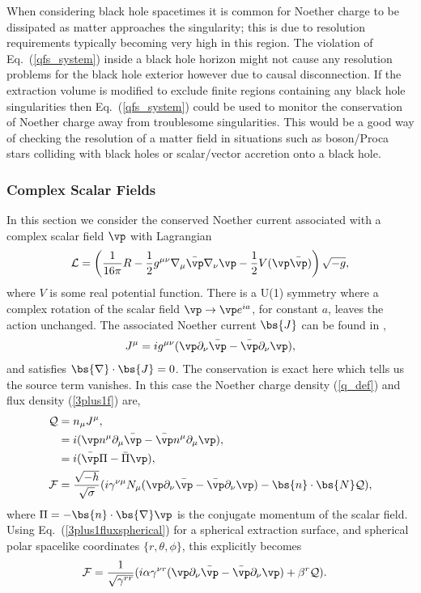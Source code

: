 When considering black hole spacetimes it is common for Noether charge to be dissipated as matter approaches the singularity; this is due to resolution requirements typically becoming very high in this region. The violation of Eq.~(\ref{qfs_system}) inside a black hole horizon might not cause any resolution problems for the black hole exterior however due to causal disconnection. If the extraction volume is modified to exclude finite regions containing any black hole singularities then Eq.~(\ref{qfs_system}) could be used to monitor the conservation of Noether charge away from troublesome singularities. This would be a good way of checking the resolution of a matter field in situations such as boson/Proca stars colliding with black holes or scalar/vector accretion onto a black hole.



\subsubsection{Complex Scalar Fields} \label{sect:noether1}
In this section we consider the conserved Noether current associated with a complex scalar field $\vp$ with Lagrangian
\begin{equation}
\label{csfl}\mathcal{L} = \left(\frac{1}{16 \pi }R -\frac{1}{2}g^{\mu\nu}\nabla_\mu \bar{\vp} \nabla_\nu \vp - \frac{1}{2}V(\vp \bar{\vp}) \right)\sqrt{-g},
\end{equation}
where $V$ is some real potential function. There is a U(1) symmetry where a complex rotation of the scalar field $\vp \rightarrow \vp e^{ia}$, for constant $a$, leaves the action unchanged. The associated Noether current $\bs{J}$ can be found in \cite{liebling2017dynamical}, 
\begin{align}
J^\mu = i g^{\mu\nu}(\vp\partial_\nu \bar\vp - \bar\vp\partial_\nu \vp),
\end{align}
and satisfies $\bs{\nabla}\cdot\bs{J} = 0$. The conservation is exact here which tells us the source term vanishes. In this case the Noether charge density (\ref{q_def}) and flux density (\ref{3plus1f}) are,
\begin{align}
\mathcal{Q}&= n_\mu J^\mu, \\
           &= i (\vp n^\mu\partial_\mu \bar\vp - \bar\vp n^\mu\partial_\mu \vp), \\
           & = i(\bar\vp \Pi - \bar\Pi \vp), \\
\mathcal{F} &= \frac{\sqrt{-h}}{\sqrt{\sigma}}(i\gamma^{\nu \mu}N_\mu (\vp \partial_\nu \bar\vp - \bar\vp \partial_\nu \vp) - \bs{n} \cdot \bs{N}  \mathcal{Q}),
\end{align}
where $\Pi = -\bs{n} \cdot\bs{\nabla}\vp$ is the conjugate momentum of the scalar field. Using Eq.~(\ref{3plus1fluxspherical}) for a spherical extraction surface, and spherical polar spacelike coordinates $\{r,\theta,\phi\}$, this explicitly becomes
\begin{align}
\mathcal{F} &= \frac{1}{\sqrt{\gamma^{rr}}}(i\alpha\gamma^{\nu r} (\vp \partial_\nu \bar\vp - \bar\vp \partial_\nu \vp) + {\beta^r} \mathcal{Q}).
       \end{align}



